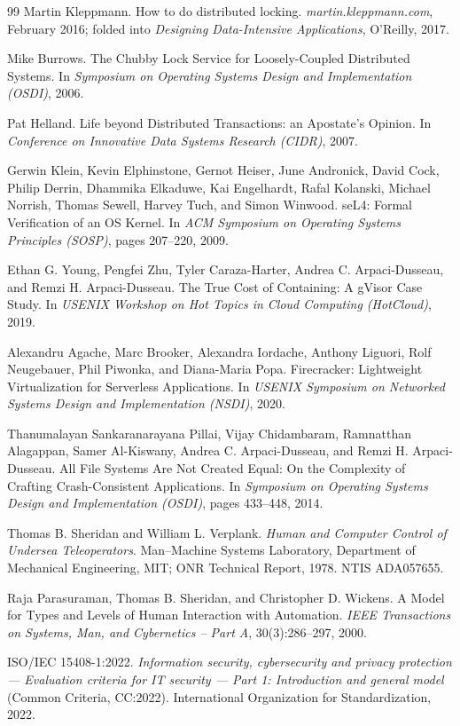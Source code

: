 \documentclass[11pt,a4paper]{article}
\theoremstyle{definition}
\theoremstyle{remark}
\begin{document}
\begin{thebibliography}{99}
Martin Kleppmann.
\newblock How to do distributed locking.
\newblock \textit{martin.kleppmann.com}, February 2016; folded into \textit{Designing Data-Intensive Applications}, O'Reilly, 2017.

Mike Burrows.
\newblock The Chubby Lock Service for Loosely-Coupled Distributed Systems.
\newblock In \textit{Symposium on Operating Systems Design and Implementation (OSDI)}, 2006.

Pat Helland.
\newblock Life beyond Distributed Transactions: an Apostate's Opinion.
\newblock In \textit{Conference on Innovative Data Systems Research (CIDR)}, 2007.

Gerwin Klein, Kevin Elphinstone, Gernot Heiser, June Andronick, David Cock, Philip Derrin, Dhammika Elkaduwe, Kai Engelhardt, Rafal Kolanski, Michael Norrish, Thomas Sewell, Harvey Tuch, and Simon Winwood.
\newblock seL4: Formal Verification of an OS Kernel.
\newblock In \textit{ACM Symposium on Operating Systems Principles (SOSP)}, pages 207--220, 2009.

Ethan G. Young, Pengfei Zhu, Tyler Caraza-Harter, Andrea C. Arpaci-Dusseau, and Remzi H. Arpaci-Dusseau.
\newblock The True Cost of Containing: A gVisor Case Study.
\newblock In \textit{USENIX Workshop on Hot Topics in Cloud Computing (HotCloud)}, 2019.

Alexandru Agache, Marc Brooker, Alexandra Iordache, Anthony Liguori, Rolf Neugebauer, Phil Piwonka, and Diana-Maria Popa.
\newblock Firecracker: Lightweight Virtualization for Serverless Applications.
\newblock In \textit{USENIX Symposium on Networked Systems Design and Implementation (NSDI)}, 2020.

Thanumalayan Sankaranarayana Pillai, Vijay Chidambaram, Ramnatthan Alagappan, Samer Al-Kiswany, Andrea C. Arpaci-Dusseau, and Remzi H. Arpaci-Dusseau.
\newblock All File Systems Are Not Created Equal: On the Complexity of Crafting Crash-Consistent Applications.
\newblock In \textit{Symposium on Operating Systems Design and Implementation (OSDI)}, pages 433--448, 2014.

Thomas B. Sheridan and William L. Verplank.
\newblock \textit{Human and Computer Control of Undersea Teleoperators}.
\newblock Man--Machine Systems Laboratory, Department of Mechanical Engineering, MIT;
ONR Technical Report, 1978. NTIS ADA057655.

Raja Parasuraman, Thomas B. Sheridan, and Christopher D. Wickens.
\newblock A Model for Types and Levels of Human Interaction with Automation.
\newblock \textit{IEEE Transactions on Systems, Man, and Cybernetics -- Part A}, 30(3):286--297, 2000.

ISO/IEC 15408-1:2022.
\newblock \textit{Information security, cybersecurity and privacy protection --- Evaluation
criteria for IT security --- Part 1: Introduction and general model} (Common Criteria, CC:2022).
\newblock International Organization for Standardization, 2022.

\end{thebibliography}
\end{document}

